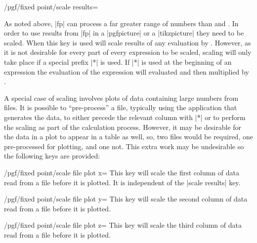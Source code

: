 \begin{key}{/pgf/fixed point/scale results=}

	As noted above, |fp| can process a far greater range of numbers
	than \pgfname{} and \tikzname{}. In order to use results from
	|fp| in a |{pgfpicture}| or a |{tikzpicture}| they need to be
	scaled. When this key is used \pgfname{} will scale results
	of any evaluation by . However, as it is not
	desirable for every part of every expression to be scaled,
	scaling will only take place if a special prefix |*| is used.
	If |*| is used at the beginning of an expression the evaluation
	of the expression will evaluated and then multiplied by
	.

\begin{codeexample}[]
\end{codeexample}

  A special case of scaling involves plots of data containing
  large numbers from files.
  It is possible to ``pre-process'' a file, typically using the
  application that generates the data, to either precede
  the relevant column with |*| or to perform the scaling as part
  of the calculation process. However, it may be desirable for
  the data in a plot to appear in a table as well, so, two files would
  be required, one pre-processed for plotting, and one not. This
  extra work may be undesirable so the following keys are provided:

\begin{key}{/pgf/fixed point/scale file plot x=}
  This key will scale the first column of data read from
  a file before it is plotted. It is independent of the
  |scale results| key.
\end{key}

\begin{key}{/pgf/fixed point/scale file plot y=}
  This key will scale the second column of data read from
  a file before it is plotted.
\end{key}

\begin{key}{/pgf/fixed point/scale file plot z=}
  This key will scale the third column of data read from
  a file before it is plotted.
\end{key}

\end{key}
